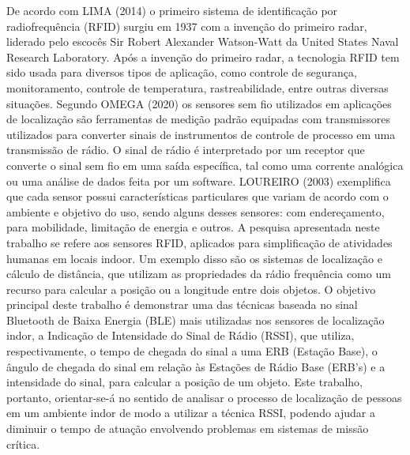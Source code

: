 \documentclass[
	article,			%
	12pt,				%
	oneside,			%
	a4paper,			%
	english,			%
	brazil,				%
	sumario=tradicional
	]{abntex2}
\begin{document}
De acordo com LIMA (2014) o primeiro sistema de identificação por radiofrequência (RFID) surgiu em 1937 com a invenção do primeiro radar, liderado pelo escocês Sir Robert Alexander Watson-Watt da United States Naval Research Laboratory.
Após a invenção do primeiro radar, a tecnologia RFID tem sido usada para diversos tipos de aplicação, como controle de segurança, monitoramento, controle de temperatura, rastreabilidade, entre outras diversas situações.
Segundo OMEGA (2020) os sensores sem fio utilizados em aplicações de localização são ferramentas de medição padrão equipadas com transmissores utilizados para converter sinais de instrumentos de controle de processo em uma transmissão de rádio. O sinal de rádio é interpretado por um receptor que converte o sinal sem fio em uma saída específica, tal como uma corrente analógica ou uma análise de dados feita por um software.  
LOUREIRO (2003) exemplifica que cada sensor possui características particulares que variam de acordo com o ambiente e objetivo do uso, sendo alguns desses sensores: com endereçamento, para mobilidade, limitação de energia e outros.
A pesquisa apresentada neste trabalho se refere aos sensores RFID, aplicados para simplificação de atividades humanas em locais indoor. Um exemplo disso são os sistemas de localização e cálculo de distância, que utilizam as propriedades da rádio frequência como um recurso para calcular a posição ou a longitude entre dois objetos.
O objetivo principal deste trabalho é demonstrar uma das técnicas baseada no sinal Bluetooth de Baixa Energia (BLE) mais utilizadas nos sensores de localização indor, a Indicação de Intensidade do Sinal de Rádio (RSSI), que utiliza, respectivamente, o tempo de chegada do sinal a uma ERB (Estação Base), o ângulo de chegada do sinal em relação às Estações de Rádio Base (ERB’s) e a intensidade do sinal, para calcular a posição de um objeto.  
Este trabalho, portanto, orientar-se-á no sentido de analisar o processo de localização de pessoas em um ambiente indor de modo a utilizar a técnica RSSI, podendo ajudar a diminuir o tempo de atuação envolvendo problemas em sistemas de missão crítica.
\end{document}
